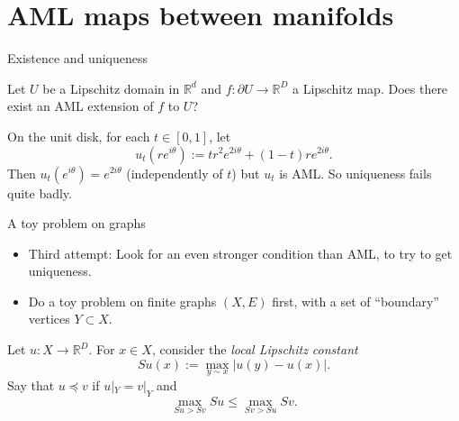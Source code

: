 \documentclass[10pt]{beamer}
\newcommand{\RR}{\mathbb{R}}
\begin{document}
\section{AML maps between manifolds}
\begin{frame}{Existence and uniqueness}
\begin{problem}
Let $U$ be a Lipschitz domain in $\RR^d$ and $f: \partial U \to \RR^D$ a Lipschitz map.
Does there exist an AML extension of $f$ to $U$? \pause
\end{problem}

\begin{example}
On the unit disk, for each $t \in [0, 1]$, let
$$u_t(re^{i\theta}) := tr^2e^{2i\theta} + (1 - t) re^{2i\theta}.$$
Then $u_t(e^{i\theta}) = e^{2i\theta}$ (independently of $t$) but $u_t$ is AML.
So uniqueness fails quite badly.
\end{example}
\end{frame}

\begin{frame}{A toy problem on graphs}
\begin{itemize}
    \item Third attempt: Look for an even stronger condition than AML, to try to get uniqueness. \pause
    \item Do a toy problem on finite graphs $(X, E)$ first, with a set of ``boundary'' vertices $Y \subset X$. \pause
\end{itemize}

\begin{definition}
Let $u: X \to \RR^D$. For $x \in X$, consider the \emph{local Lipschitz constant}
$$Su(x) := \max_{y \sim x} |u(y) - u(x)|.$$
Say that $u \preceq v$ if $u|_Y = v|_Y$ and
$$\max_{Su > Sv} Su \leq \max_{Sv > Su} Sv.$$
\end{definition}
\end{frame}
\end{document}
